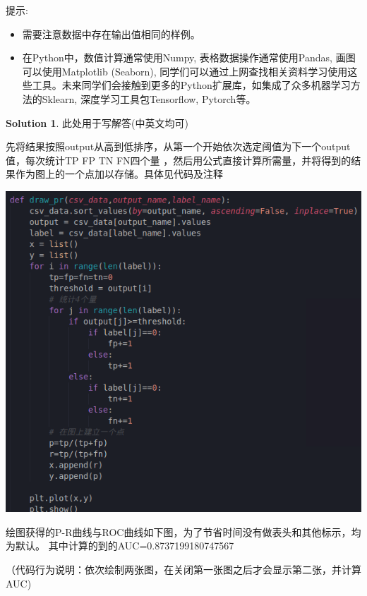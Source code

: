 \documentclass[a4paper,UTF8]{article}
\theoremstyle{definition}
\newtheorem*{solution}{Solution}
\begin{document}
提示:
\begin{itemize}
	\item 需要注意数据中存在输出值相同的样例。
	\item 
	在Python中，数值计算通常使用Numpy, 表格数据操作通常使用Pandas, 画图可以使用Matplotlib (Seaborn), 同学们可以通过上网查找相关资料学习使用这些工具。未来同学们会接触到更多的Python扩展库，如集成了众多机器学习方法的Sklearn, 深度学习工具包Tensorflow, Pytorch等。
\end{itemize}
\begin{solution}
此处用于写解答(中英文均可)
\begin{tcolorbox}
	\qquad 先将结果按照output从高到低排序，从第一个开始依次选定阈值为下一个output值，每次统计TP FP TN FN四个量
	，然后用公式直接计算所需量，并将得到的结果作为图上的一个点加以存储。具体见代码及注释

	\includegraphics[width=1\textwidth]{Pr2_code.png}
	
	\qquad 绘图获得的P-R曲线与ROC曲线如下图，为了节省时间没有做表头和其他标示，均为默认。
	其中计算的到的AUC=0.8737199180747567

	（代码行为说明：依次绘制两张图，在关闭第一张图之后才会显示第二张，并计算AUC)


\end{tcolorbox}
\end{solution}
\end{document}
